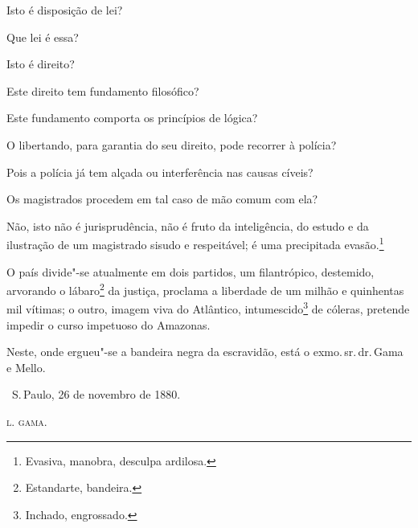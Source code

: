 Isto é disposição de lei?

Que lei é essa?

Isto é direito?

Este direito tem fundamento filosófico?

Este fundamento comporta os princípios de lógica?

O libertando, para garantia do seu direito, pode recorrer à polícia?

Pois a polícia já tem alçada ou interferência nas causas cíveis?

Os magistrados procedem em tal caso de mão comum com ela?

Não, isto não é jurisprudência, não é fruto da inteligência, do estudo e
da ilustração de um magistrado sisudo e respeitável; é uma precipitada
evasão.\footnote{Evasiva, manobra, desculpa ardilosa.}

O país divide"-se atualmente em dois partidos, um filantrópico,
destemido, arvorando o lábaro\footnote{Estandarte, bandeira.} da
justiça, proclama a liberdade de um milhão e quinhentas mil vítimas; o
outro, imagem viva do Atlântico, intumescido\footnote{Inchado,
  engrossado.} de cóleras,
pretende impedir o curso impetuoso do Amazonas.

Neste, onde ergueu"-se a bandeira negra da escravidão, está o exmo.\,sr.\,dr.\,Gama e Mello.

\bigskip

\hfill\ S.\,Paulo, 26 de novembro de 1880.\smallskip

\hfill\textsc{l. gama.}

\pagebreak
\mbox{}\vfill
\thispagestyle{empty}

